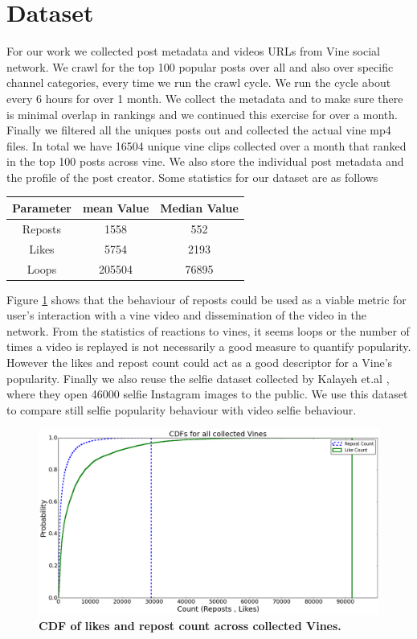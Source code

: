 \section{Dataset}
For our work we collected post metadata and videos URLs from Vine social network. We crawl for the top 100 popular posts over all and also over specific channel categories, every time we run the crawl cycle. We run the cycle about every 6 hours for over 1 month. We collect the metadata and to make sure there is minimal overlap in rankings and we continued this exercise for over a month. Finally we filtered all the uniques posts out and collected the actual vine mp4 files. In total we have 16504 unique vine clips collected over a month that ranked in the top 100 posts across vine. We also store the individual post metadata and the profile of the post creator. Some statistics for our dataset are as follows 
\par
\begin{center}
\begin{tabular}{ |c|c|c| } 
 \hline
 Parameter & mean Value & Median Value \\ 
 \hline
 Reposts & 1558 & 552 \\ 
 Likes & 5754 & 2193 \\ 
 Loops & 205504 & 76895 \\ 
 \hline
\end{tabular}
\end{center}
\par
Figure \ref{fig:Like_Repost_CDF} shows that the behaviour of reposts could be used as a viable metric for user's interaction with a vine video and dissemination of the video in the network. From the statistics of reactions to vines, it seems loops or the number of times a video is replayed is not necessarily a good measure to quantify popularity. However the likes and repost count could act as a good descriptor for a Vine's popularity. Finally we also reuse the selfie dataset collected by Kalayeh et.al \cite{goodSelfie}, where they open 46000 selfie Instagram images to the public. We use this dataset to compare still selfie popularity behaviour with video selfie behaviour.

\begin{figure}
\centering
\includegraphics[width=\columnwidth]{plots/Like_repost_CDF}
\caption{\textbf{CDF of likes and repost count across collected Vines.}}
\label{fig:Like_Repost_CDF}
\end{figure}